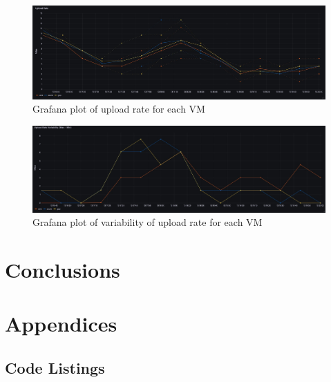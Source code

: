 \documentclass[11pt,a4paper]{article}
\begin{document}
\begin{figure}
\label{upload}
\includegraphics[width=\textwidth]{UploadRate.jpeg}
\caption{Grafana plot of upload rate for each VM}
\end{figure}

\begin{figure}
\label{upload-var}
\includegraphics[width=\textwidth]{UploadRateVar.jpeg}
\caption{Grafana plot of variability of upload rate for each VM}
\end{figure}

\section*{Conclusions}

\section*{Appendices}

\subsection*{Code Listings}





\end{document}
